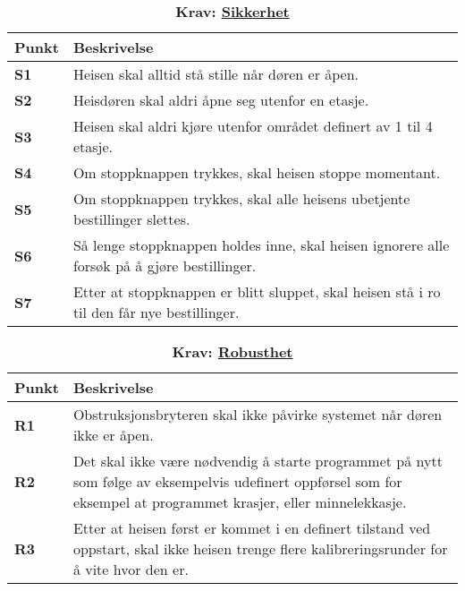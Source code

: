 \begin{table}[H]
    \centering
    \caption*{\textbf{\textcolor{NTNU_blue}{Krav}: \underline{Sikkerhet}}}
    \begin{tabular}{@{}  |p{1.25cm}| p{12.25cm}|  @{}}
    \hline
      \textbf{Punkt}             & \textbf{Beskrivelse} \\
    \hline
    \textbf{\textcolor{NTNU_blue}{S1}} & Heisen skal alltid stå stille når døren er åpen.\\\cline{1-2} 
    \textbf{\textcolor{NTNU_blue}{S2}} & Heisdøren skal aldri åpne seg utenfor en etasje.\\\cline{1-2} 
    \textbf{\textcolor{NTNU_blue}{S3}} & Heisen skal aldri kjøre utenfor området definert av 1 til 4 etasje.\\\cline{1-2} 
    \textbf{\textcolor{NTNU_blue}{S4}} & Om stoppknappen trykkes, skal heisen stoppe momentant.\\\cline{1-2} 
    \textbf{\textcolor{NTNU_blue}{S5}} & Om stoppknappen trykkes, skal alle heisens ubetjente bestillinger slettes.\\\cline{1-2} 
    \textbf{\textcolor{NTNU_blue}{S6}} & Så lenge stoppknappen holdes inne, skal heisen ignorere alle forsøk på å gjøre bestillinger.\\\cline{1-2} 
    \textbf{\textcolor{NTNU_blue}{S7}} & Etter at stoppknappen er blitt sluppet, skal heisen stå i ro til den får nye bestillinger.\\\cline{1-2} 
    \end{tabular}
\end{table}


\begin{table}[H]
    \centering
    \caption*{\textbf{\textcolor{NTNU_blue}{Krav}: \underline{Robusthet}}}
    \begin{tabular}{@{}  |p{1.25cm}| p{12.25cm}|  @{}}
    \hline
      \textbf{Punkt}             & \textbf{Beskrivelse} \\
    \hline
    \textbf{\textcolor{NTNU_blue}{R1}} & Obstruksjonsbryteren skal ikke påvirke systemet når døren ikke er åpen.\\\cline{1-2} 
    \textbf{\textcolor{NTNU_blue}{R2}} & Det skal ikke være nødvendig å starte programmet på nytt som følge av eksempelvis udefinert oppførsel som for eksempel at programmet krasjer, eller minnelekkasje.\\\cline{1-2} 
    \textbf{\textcolor{NTNU_blue}{R3}} & Etter at heisen først er kommet i en definert tilstand ved oppstart, skal ikke heisen trenge flere kalibreringsrunder for å vite hvor den er.\\\cline{1-2} 
    \end{tabular}
\end{table}


